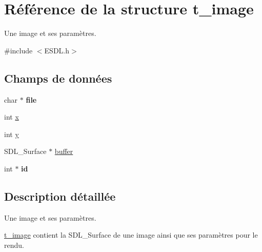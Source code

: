 \hypertarget{structt__image}{\section{Référence de la structure t\+\_\+image}
\label{structt__image}
}


Une image et ses paramètres.  




{\ttfamily \#include $<$E\+S\+D\+L.\+h$>$}

\subsection*{Champs de données}
\begin{DoxyCompactItemize}
\item 
\hypertarget{structt__image_a1d72bca0218880563fb912a33797a03d}{char $\ast$ {\bfseries file}}\label{structt__image_a1d72bca0218880563fb912a33797a03d}

\item 
int \hyperlink{structt__image_a6209266e69a1c07e69a0edad4b5ed99a}{x}
\item 
int \hyperlink{structt__image_a36899f0d81d2dd929228111bd258a762}{y}
\item 
S\+D\+L\+\_\+\+Surface $\ast$ \hyperlink{structt__image_a73c500129a82da9a5a076cfc62f7d542}{buffer}
\item 
\hypertarget{structt__image_a726da9485aa7bb7d5ecd56edbd04140b}{int $\ast$ {\bfseries id}}\label{structt__image_a726da9485aa7bb7d5ecd56edbd04140b}

\end{DoxyCompactItemize}


\subsection{Description détaillée}
Une image et ses paramètres. 

\hyperlink{structt__image}{t\+\_\+image} contient la S\+D\+L\+\_\+\+Surface de une image ainsi que ses paramètres pour le rendu. 

